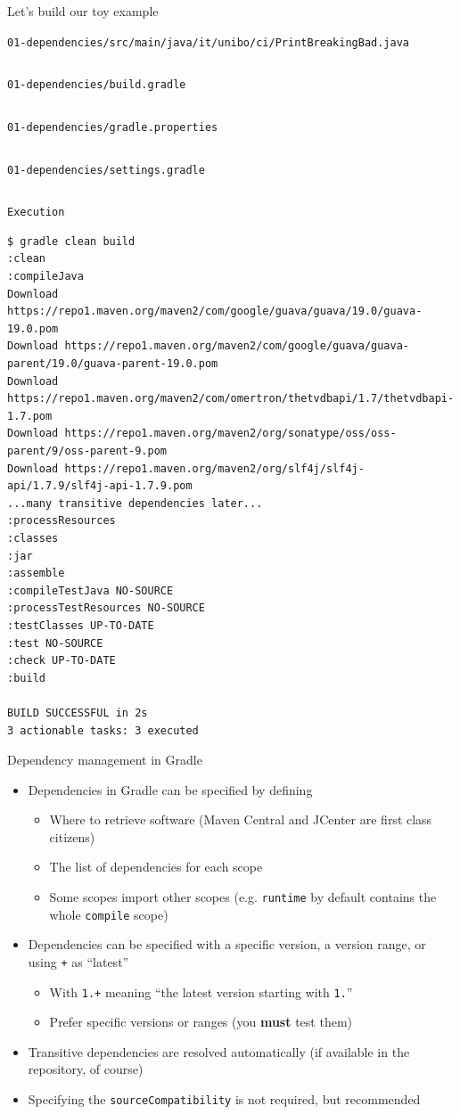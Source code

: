 \documentclass[presentation]{beamer}
\newcommand{\codefile}[3]{
	\begin{block}{\texttt{#1}}
		\inputminted[fontsize=#2,linenos=true,breaklines=true]{#3}{workspace/#1}
	\end{block}
}
\newcommand{\java}[2]{\codefile{#1}{#2}{java}}
\newcommand{\groovy}[2]{\codefile{#1}{#2}{groovy}}
\begin{document}
\begin{frame}{Let's build our toy example}
	\java{01-dependencies/src/main/java/it/unibo/ci/PrintBreakingBad.java}{\tiny}
	\groovy{01-dependencies/build.gradle}{\scriptsize}
	\groovy{01-dependencies/gradle.properties}{\scriptsize}
	\groovy{01-dependencies/settings.gradle}{\scriptsize}
	\begin{block}{\texttt{Execution}}
		\begin{verbatim}
$ gradle clean build
:clean
:compileJava
Download https://repo1.maven.org/maven2/com/google/guava/guava/19.0/guava-19.0.pom
Download https://repo1.maven.org/maven2/com/google/guava/guava-parent/19.0/guava-parent-19.0.pom
Download https://repo1.maven.org/maven2/com/omertron/thetvdbapi/1.7/thetvdbapi-1.7.pom
Download https://repo1.maven.org/maven2/org/sonatype/oss/oss-parent/9/oss-parent-9.pom
Download https://repo1.maven.org/maven2/org/slf4j/slf4j-api/1.7.9/slf4j-api-1.7.9.pom
...many transitive dependencies later...
:processResources
:classes
:jar
:assemble
:compileTestJava NO-SOURCE
:processTestResources NO-SOURCE
:testClasses UP-TO-DATE
:test NO-SOURCE
:check UP-TO-DATE
:build

BUILD SUCCESSFUL in 2s
3 actionable tasks: 3 executed
		\end{verbatim}
	\end{block}
\end{frame}

\begin{frame}[fragile]{Dependency management in Gradle}
	\begin{itemize}
		\item Dependencies in Gradle can be specified by defining
		\begin{itemize}
			\item Where to retrieve software (Maven Central and JCenter are first class citizens)
			\item The list of dependencies for each scope
			\item Some scopes import other scopes (e.g. \texttt{runtime} by default contains the whole \texttt{compile} scope)
		\end{itemize}
		\item Dependencies can be specified with a specific version, a version range, or using \texttt{+} as ``latest''
		\begin{itemize}
			\item With \texttt{1.+} meaning ``the latest version starting with \texttt{1.}''
			\item Prefer specific versions or ranges (you \textbf{must} test them)
		\end{itemize}
		\item Transitive dependencies are resolved automatically (if available in the repository, of course)
		\item Specifying the \texttt{sourceCompatibility} is not required, but recommended
	\end{itemize}
\end{frame}
\end{document}
